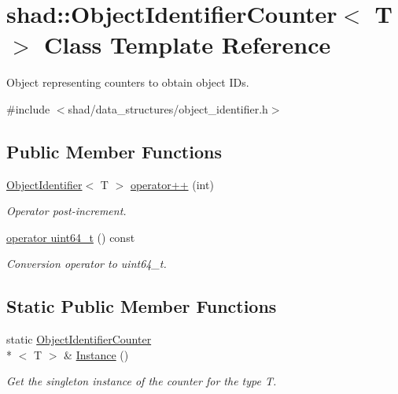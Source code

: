 \hypertarget{classshad_1_1ObjectIdentifierCounter}{\section{shad\-:\-:Object\-Identifier\-Counter$<$ T $>$ Class Template Reference}
\label{classshad_1_1ObjectIdentifierCounter}
}


Object representing counters to obtain object I\-Ds.  




{\ttfamily \#include $<$shad/data\-\_\-structures/object\-\_\-identifier.\-h$>$}

\subsection*{Public Member Functions}
\begin{DoxyCompactItemize}
\item 
\hyperlink{classshad_1_1ObjectIdentifier}{Object\-Identifier}$<$ T $>$ \hyperlink{classshad_1_1ObjectIdentifierCounter_a0169eb5cd10c47d139690300e29628a2}{operator++} (int)
\begin{DoxyCompactList}\small\item\em Operator post-\/increment. \end{DoxyCompactList}\item 
\hyperlink{classshad_1_1ObjectIdentifierCounter_ad798d72e0089622873740e6e9b12d561}{operator uint64\-\_\-t} () const 
\begin{DoxyCompactList}\small\item\em Conversion operator to uint64\-\_\-t. \end{DoxyCompactList}\end{DoxyCompactItemize}
\subsection*{Static Public Member Functions}
\begin{DoxyCompactItemize}
\item 
static \hyperlink{classshad_1_1ObjectIdentifierCounter}{Object\-Identifier\-Counter}\\*
$<$ T $>$ \& \hyperlink{classshad_1_1ObjectIdentifierCounter_a6626603afa5ec26056e889ede634c5aa}{Instance} ()
\begin{DoxyCompactList}\small\item\em Get the singleton instance of the counter for the type T. \end{DoxyCompactList}\end{DoxyCompactItemize}


